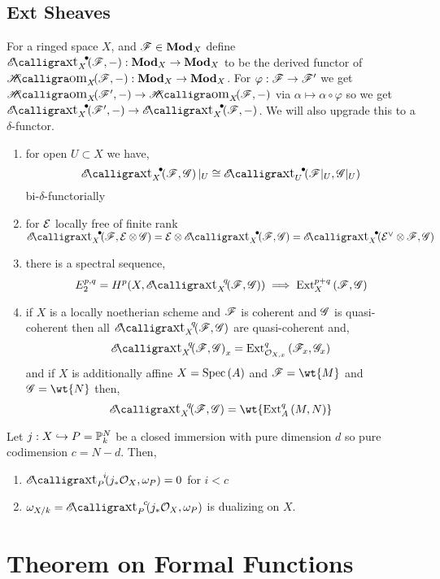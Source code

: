 \documentclass[12pt]{article}
\begin{document}
\subsection{Ext Sheaves}

\begin{defn}
For a ringed space $X$, and $\mathscr{F} \in \mathbf{Mod}_{X}$ define $\shExt{\bullet}{X}{\F}{-} : \Mod{X} \to \Mod{X}$ to be the derived functor of $\shHom{X}{\F}{-} : \Mod{X} \to \Mod{X}$. For $\varphi : \mathscr{F} \to \mathscr{F}'$ we get $\shHom{X}{\F'}{-} \to \shHom{X}{\F}{-}$ via $\alpha \mapsto \alpha \circ \varphi$ so we get $\shExt{\bullet}{X}{\F'}{-} \to \shExt{\bullet}{X}{\F}{-}$. We will also upgrade this to a $\delta$-functor.
\end{defn}

\begin{prop}
\begin{enumerate}
\item for open $U \subset X$ we have,
\[ \shExt{\bullet}{X}{\F}{\G}|_U \cong \shExt{\bullet}{U}{\F|_U}{\G|_U} \]
bi-$\delta$-functorially
\item for $\mathcal{E}$ locally free of finite rank $\shExt{\bullet}{X}{\F}{\E \ot \G} = \E \ot \shExt{\bullet}{X}{\F}{\G} = \shExt{\bullet}{X}{\E^\vee \ot \F}{\G}$
\item there is a spectral sequence,
\[ E^{p,q}_2 = H^p(X, \shExt{q}{X}{\F}{\G}) \implies \Ext{p+q}{X}{\F}{\G} \]
\item if $X$ is a locally noetherian scheme and $\mathscr{F}$ is coherent and $\mathscr{G}$ is quasi-coherent then all $\shExt{q}{X}{\F}{\G}$ are quasi-coherent and,
\[ \shExt{q}{X}{\F}{\G}_x = \Ext{q}{\stalk{X}{x}}{\F_x}{\G_x} \]
and if $X$ is additionally affine $X = \mathrm{Spec}\left( A \right)$ and $\F = \wt{M}$ and $\G = \wt{N}$ then, 
\[ \shExt{q}{X}{\F}{\G} = \wt{\Ext{q}{A}{M}{N}} \]
\end{enumerate}
\end{prop}

\begin{prop}
Let $j : X \hookrightarrow P = \mathbb{P}^N_k$ be a closed immersion with pure dimension $d$ so pure codimension $c = N - d$. Then,
\begin{enumerate}
\item $\shExt{i}{P}{j_* \struct{X}}{\omega_P} = 0$ for $i < c$ 
\item $\omega_{X/k} = \shExt{c}{P}{j_* \struct{X}}{\omega_P}$ is dualizing on $X$.
\end{enumerate}
\end{prop}

\section{Theorem on Formal Functions}
\end{document}
